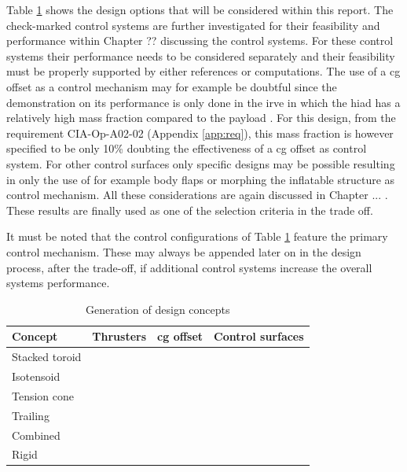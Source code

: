 Table \ref{tab:designconcepts} shows the design options that will be considered within this report. The check-marked control systems are further investigated for their feasibility and performance within Chapter ?? discussing the control systems. For these control systems their performance needs to be considered separately and their feasibility must be properly supported by either references or computations. The use of a \gls{cg} offset as a control mechanism may for example be doubtful since the demonstration on its performance is only done in the \gls{irve} in which the \gls{hiad} has a relatively high mass fraction compared to the payload \cite{Dillman2012}. For this design, from the requirement CIA-Op-A02-02 (Appendix \ref{app:req}), this mass fraction is however specified to be only 10\% doubting the effectiveness of a \gls{cg} offset as control system. For other control surfaces only specific designs may be possible resulting in only the use of for example body flaps or morphing the inflatable structure as control mechanism. All these considerations are again discussed in Chapter ... . These results are finally used as one of the selection criteria in the trade off.

It must be noted that the control configurations of Table \ref{tab:designconcepts} feature the primary control mechanism. These may always be appended later on in the design process, after the trade-off, if additional control systems increase the overall systems performance. 

\begin{table}[H]
	\caption{Generation of design concepts}
	\label{tab:designconcepts}
	\centering
		\begin{tabular}{|p{}|p{}|p{}|p{}|} \hline 
			\textbf{Concept} & \textbf{Thrusters}	& \textbf{\gls{cg} offset} &  \textbf{Control surfaces} \\ \hline \hline
			Stacked toroid   & \cmark	& \cmark &  \cmark \\ \hline
			Isotensoid		 & \cmark	& \cmark &  \xmark\\ \hline
			Tension cone	 & \cmark	& \cmark &  \cmark \\ \hline
			Trailing 		 & \xmark	& \cmark &  \cmark \\ \hline
			Combined 		 & \xmark	& \cmark &  \cmark \\ \hline
			Rigid  		   	 & \cmark	& \cmark &  \cmark \\ \hline
		\end{tabular}
\end{table}

